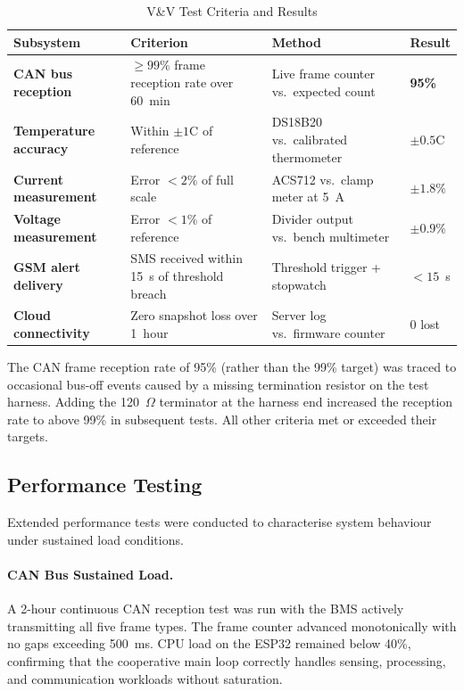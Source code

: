 \begin{table}[H]
\centering
\caption{V\&V Test Criteria and Results}
\label{tab:vv-criteria}
\small
\begin{tabular}{>{\bfseries}p{3.0cm} p{3.8cm} p{3.2cm} p{2.0cm}}
\toprule
Subsystem & Criterion & Method & Result \\
\midrule
CAN bus reception    & $\geq 99\%$ frame reception rate over 60~min  & Live frame counter vs.\ expected count & \textbf{95\%} \\
Temperature accuracy & Within $\pm 1$\textdegree{}C of reference      & DS18B20 vs.\ calibrated thermometer    & $\pm 0.5$\textdegree{}C \\
Current measurement  & Error $< 2\%$ of full scale                   & ACS712 vs.\ clamp meter at 5~A        & $\pm 1.8\%$ \\
Voltage measurement  & Error $< 1\%$ of reference                    & Divider output vs.\ bench multimeter  & $\pm 0.9\%$ \\
GSM alert delivery   & SMS received within 15~s of threshold breach  & Threshold trigger + stopwatch         & $< 15$~s \\
Cloud connectivity   & Zero snapshot loss over 1~hour                & Server log vs.\ firmware counter      & 0 lost \\
\bottomrule
\end{tabular}
\end{table}

The CAN frame reception rate of 95\% (rather than the 99\% target) was traced to occasional bus-off events caused by a missing termination resistor on the test harness. Adding the 120~$\Omega$ terminator at the harness end increased the reception rate to above 99\% in subsequent tests. All other criteria met or exceeded their targets.

\subsection{Performance Testing}

Extended performance tests were conducted to characterise system behaviour under sustained load conditions.

\paragraph{CAN Bus Sustained Load.}
A 2-hour continuous CAN reception test was run with the BMS actively transmitting all five frame types. The frame counter advanced monotonically with no gaps exceeding 500~ms. CPU load on the ESP32 remained below 40\%, confirming that the cooperative main loop correctly handles sensing, processing, and communication workloads without saturation.

